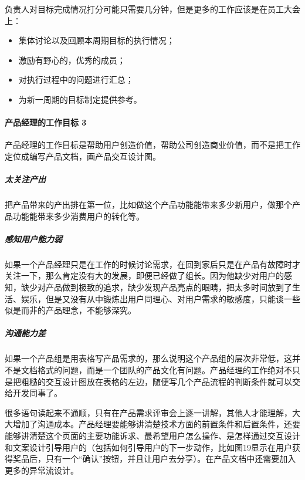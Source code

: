 \documentclass[letterpaper,11pt,english]{sphinxmanual}
\begin{document}
负责人对目标完成情况打分可能只需要几分钟，但是更多的工作应该是在员工大会上：
\begin{itemize}
\item {} 
集体讨论以及回顾本周期目标的执行情况；

\item {} 
激励有野心的，优秀的成员；

\item {} 
对执行过程中的问题进行汇总；

\item {} 
为新一周期的目标制定提供参考。

\end{itemize}


\paragraph{产品经理的工作目标 3\sphinxfootnotemark[356]}
\label{\detokenize{chapter_idea/goal:id4}}%
\begin{footnotetext}[356]\sphinxAtStartFootnote
{}
%
\end{footnotetext}\ignorespaces 
产品经理的工作目标是帮助用户创造价值，帮助公司创造商业价值，而不是把工作定位成编写产品文档，画产品交互设计图。


\subparagraph{太关注产出}
\label{\detokenize{chapter_idea/goal:id5}}
把产品带来的产出排在第一位，比如做这个产品功能能带来多少新用户，做那个产品功能能带来多少消费用户的转化等。


\subparagraph{感知用户能力弱}
\label{\detokenize{chapter_idea/goal:id6}}
如果一个产品经理只是在工作的时候讨论需求，在回到家后只是在产品有故障时才关注一下，那么肯定没有大的发展，即便已经做了组长。因为他缺少对用户的感知，缺少对产品做到极致的追求，缺少发现产品亮点的眼睛，把太多时间放到了生活、娱乐，但是又没有从中锻炼出用户同理心、对用户需求的敏感度，只能谈一些似是而非的产品理念，不能够深究。


\subparagraph{沟通能力差}
\label{\detokenize{chapter_idea/goal:id7}}
如果一个产品组是用表格写产品需求的，那么说明这个产品组的层次非常低，这并不是文档格式的问题，而是一个团队的产品文化有问题。产品经理的工作绝对不只是把粗糙的交互设计图放在表格的左边，随便写几个产品流程的判断条件就可以交给开发同事了。

很多语句读起来不通顺，只有在产品需求评审会上逐一讲解，其他人才能理解，大大增加了沟通成本。产品经理要能够讲清楚技术方面的前置条件和后置条件，还要能够讲清楚这个页面的主要功能诉求、最希望用户怎么操作、是怎样通过交互设计和文案设计引导用户的（包括如何引导用户的下一步动作，比如图1\sphinxhyphen{}9显示在用户获得奖品后，只有一个“确认”按钮，并且让用户去分享）。在产品文档中还需要加入更多的异常流设计。
\end{document}

